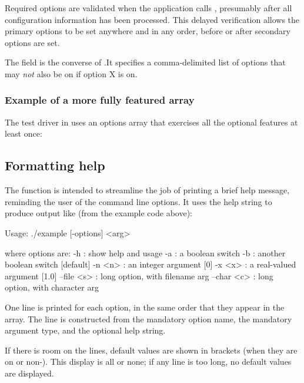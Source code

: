 Required options are validated when the application calls
, presumably after all configuration
information has been processed. This delayed verification allows the
primary options to be set anywhere and in any order, before or after
secondary options are set.

The  field is the converse of
.It specifies a comma-delimited list of options
that may \emph{not} also be on if option X is on.



   \subsubsection{Example of a more fully featured  array}

The test driver in  uses an options array that
exercises all the optional features at least once:




\subsection{Formatting help}


The  function is intended to streamline
the job of printing a brief help message, reminding the user of the
command line options. It uses the help string to produce output like
(from the example code above):

\begin{cchunk}
Usage: ./example [-options] <arg>

  where options are:
  -h         : show help and usage
  -a         : a boolean switch
  -b         : another boolean switch  [default]
  -n <n>     : an integer argument  [0]
  -x <x>     : a real-valued argument  [1.0]
  --file <s> : long option, with filename arg
  --char <c> : long option, with character arg
\end{cchunk}

One line is printed for each option, in the same order that they
appear in the  array. The line is constructed from
the mandatory option name, the mandatory argument type, and the
optional help string.

If there is room on the lines, default values are shown in brackets
(when they are on or non-). This display is all or none;
if any line is too long, no default values are displayed.

